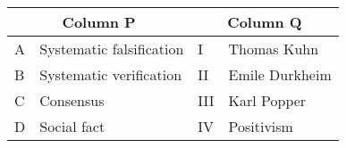 \begin{tabular}{|ll|ll|}
        \hline
        \multicolumn{2}{|c|}{\textbf{Column P}} & \multicolumn{2}{c|}{\textbf{Column Q}} \\
        \hline
        A & Systematic falsification & I & Thomas Kuhn \\
        B & Systematic verification & II & Emile Durkheim \\
        C & Consensus & III & Karl Popper \\
        D & Social fact & IV & Positivism \\
        \hline
    \end{tabular}

